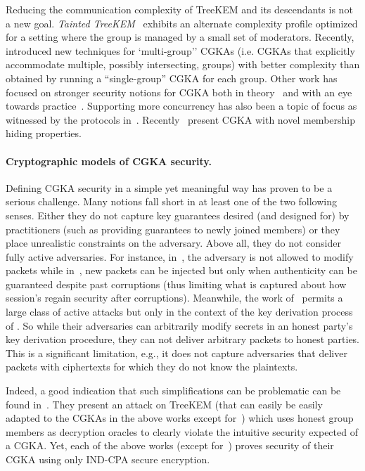 Reducing the communication complexity of TreeKEM and its descendants is not a
new goal. \emph{Tainted TreeKEM}~\cite{SP:ACC+21} exhibits an alternate
complexity profile optimized for a setting where the group is managed by a
small set of moderators. Recently,~\cite{TCC:AABNKPPW21} introduced new
techniques for `multi-group'' CGKAs (i.e. CGKAs that explicitly accommodate
multiple, possibly intersecting, groups) with better complexity than obtained
by running a ``single-group'' CGKA for each group. Other work has focused on
stronger security notions for CGKA both in theory~\cite{TCC:ACJM20} and with
an eye towards practice~\cite{C:ACDT20,EPRINT:AlwJosMul20}. Supporting more
concurrency has also been a topic of focus as witnessed by the protocols
in~\cite{Eprint:BDR20,TreeKEM-prop-and-comm-email,Wei19}.
Recently~\cite{EPRINT:EKNOO22} present CGKA with novel membership hiding
properties.

\paragraph{Cryptographic models of CGKA security.}
Defining CGKA security in a simple yet meaningful way has proven to be a
serious challenge. Many notions fall short in at least one of the two
following senses. Either they do not capture key guarantees desired (and
designed for) by practitioners (such as providing guarantees to newly joined
members) or they place unrealistic constraints on the adversary. Above all,
they do not consider fully active adversaries. For instance,
in~\cite{SP:ACC+21}, the adversary is not allowed to modify packets while
in~\cite{C:ACDT20,CCS:ACDT21}, new packets can be injected but only when
authenticity can be guaranteed despite past corruptions (thus limiting what
is captured about how session's regain security after corruptions).
Meanwhile, the work of~\cite{Eprint:BCK21} permits a large class of active
attacks but only in the context of the key derivation process of \protITK{}.
So while their adversaries can arbitrarily modify secrets in an honest
party's key derivation procedure, they can not deliver arbitrary packets to
honest parties. This is a significant limitation, e.g., it does not capture
adversaries that deliver packets with ciphertexts for which they do not know
the plaintexts.

Indeed, a good indication that such simplifications can be problematic can be
found in~\cite{EPRINT:AlwJosMul20}. They present an attack on TreeKEM
(that can easily be easily adapted to the CGKAs in the above works except
for~\cite{Eprint:BCK21}) which uses honest group members as decryption oracles
to clearly violate the intuitive security expected of a CGKA. Yet, each of
the above works (except for~\cite{Eprint:BCK21}) proves security of their
CGKA using only IND-CPA secure encryption.

